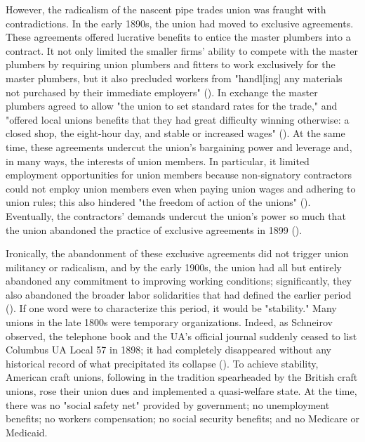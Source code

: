 \documentclass[12pt]{article}
\begin{document}
However, the radicalism of the nascent pipe trades union was fraught with contradictions. In the early 1890s, the union had moved to exclusive agreements. These agreements offered lucrative benefits to entice the master plumbers into a contract. It not only limited the smaller firms’ ability to compete with the master plumbers by requiring union plumbers and fitters to work exclusively for the master plumbers, but it also precluded workers from "handl[ing] any materials not purchased by their immediate employers" (\cite[54]{schneirovPrideSolidarityHistory1993}). In exchange the master plumbers agreed to allow "the union to set standard rates for the trade," and "offered local unions benefits that they had great difficulty winning otherwise: a closed shop, the eight-hour day, and stable or increased wages" (\citeyear[54]{schneirovPrideSolidarityHistory1993}). At the same time, these agreements undercut the union’s bargaining power and leverage and, in many ways, the interests of union members. In particular, it limited employment opportunities for union members because non-signatory contractors could not employ union members even when paying union wages and adhering to union rules; this also hindered "the freedom of action of the unions" (\citeyear[54]{schneirovPrideSolidarityHistory1993}). Eventually, the contractors’ demands undercut the union’s power so much that the union abandoned the practice of exclusive agreements in 1899 (\citeyear[54–55]{schneirovPrideSolidarityHistory1993}).

Ironically, the abandonment of these exclusive agreements did not trigger union militancy or radicalism, and by the early 1900s, the union had all but entirely abandoned any commitment to improving working conditions; significantly, they also abandoned the broader labor solidarities that had defined the earlier period (\cite[51–54]{schneirovPrideSolidarityHistory1993}). If one word were to characterize this period, it would be "stability." Many unions in the late 1800s were temporary organizations. Indeed, as Schneirov observed, the telephone book and the UA’s official journal suddenly ceased to list Columbus UA Local 57 in 1898; it had completely disappeared without any historical record of what precipitated its collapse  (\citeyear[51]{schneirovPrideSolidarityHistory1993}). To achieve stability, American craft unions, following in the tradition spearheaded by the British craft unions, rose their union dues and implemented a quasi-welfare state. At the time, there was no "social safety net" provided by government; no unemployment benefits; no workers compensation; no social security benefits; and no Medicare or Medicaid. 
\end{document}

